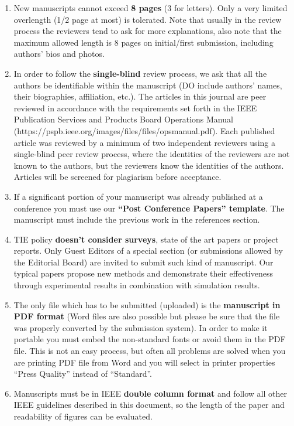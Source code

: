 \documentclass[journal]{IEEEtranTIE}
\begin{document}
\begin{enumerate}[1)]
	\item New manuscripts cannot exceed \textbf{8 pages} (3 for letters). Only a very limited overlength (1/2 page at most) is tolerated. Note that usually in the review process the reviewers tend to ask for more explanations, also note that the maximum allowed length is 8 pages on initial/first submission, including authors' bios and photos.
	\item In order to follow the \textbf{single-blind} review process, we ask that all the authors be identifiable within the manuscript (DO include authors' names, their biographies, affiliation, etc.). The articles in this journal are peer reviewed in accordance with the requirements set forth in the IEEE Publication Services and Products Board Operations Manual (https://pspb.ieee.org/images/files/files/opsmanual.pdf). Each published article was reviewed by a minimum of two independent reviewers using a single-blind peer review process, where the identities of the reviewers are not known to the authors, but the reviewers know the identities of the authors. Articles will be screened for plagiarism before acceptance.
	\item If a significant portion of your manuscript was already published at a conference you must use our \textbf{``Post Conference Papers'' template}. The manuscript must include the previous work in the references section. 
	\item TIE policy \textbf{doesn't consider surveys}, state of the art papers or project reports. Only Guest Editors of a special section (or submissions allowed by the Editorial Board) are invited to submit such kind of manuscript. Our typical papers propose new methods and demonstrate their effectiveness through experimental results in combination with simulation results.
	\item The only file which has to be submitted (uploaded) is the \textbf{manuscript in PDF format} (Word files are also possible but please be sure that the file was properly converted by the submission system). In order to make it portable you must embed the non-standard fonts or avoid them in the PDF file. This is not an easy process, but often all problems are solved when you are printing PDF file from Word and you will select in printer properties  ``Press Quality'' instead of ``Standard''.
	\item Manuscripts must be in IEEE \textbf{double column format} and follow all other IEEE guidelines described in this document, so the length of the paper and readability of figures can be evaluated.

\end{enumerate}
\end{document}
